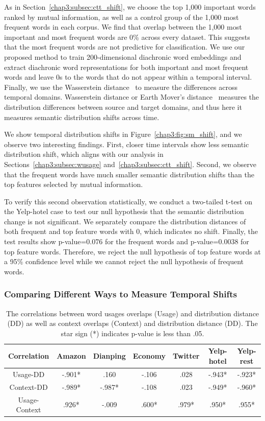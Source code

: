 As in Section~\ref{chap3:subsec:ctt_shift},
we choose the top 1,000 important words ranked by mutual information, as well as a control group of the 1,000 most frequent words in each corpus.  We find that overlap between the 1,000 most important and most frequent words are 0\% across every dataset. This suggests that the most frequent words are not predictive for classification. 
We use our proposed method to train 200-dimensional diachronic word embeddings and extract diachronic word representations for both important and most frequent words and leave 0s to the words that do not appear within a temporal interval. 
Finally, we use the Wasserstein distance~\cite{vallender1974calculation} to measure the differences across temporal domains.
Wasserstein distance or Earth Mover's distance~\cite{vallender1974calculation} measures the distribution differences between source and target domains,
and thus here it measures semantic distribution shifts across time. 

We show temporal distribution shifts in Figure~\ref{chap3:fig:sm_shift}, 
and we observe two interesting findings. 
First, closer time intervals show less semantic distribution shift, which aligns with our analysis in Sections~\ref{chap3:subsec:wusage} and~\ref{chap3:subsec:ctt_shift}. Second, we observe that the frequent words have much smaller semantic distribution shifts than the top features selected by mutual information. 

To verify this second observation statistically, we conduct a two-tailed t-test on the Yelp-hotel case to test our null hypothesis that the semantic distribution change is not significant. We separately compare the distribution distances of both frequent and top feature words with 0, which indicates no shift. Finally, the test results show p-value=0.076 for the frequent words and p-value=0.0038 for top feature words. Therefore, we reject the null hypothesis of top feature words at a 95\% confidence level while we cannot reject the null hypothesis of frequent words.


\subsubsection{Comparing Different Ways to Measure Temporal Shifts}

\begin{table}[ht]
\centering
\begin{tabular}{c||cccccc}
Correlation & Amazon  & Dianping & Economy & Twitter & Yelp-hotel & Yelp-rest \\\hline\hline
Usage-DD    & -.901* & .160    & -.106  & .028   & -.943*    & -.923*   \\
Context-DD  & -.989* & -.987*   & -.108  & .023   & -.949*    & -.960*  \\
Usage-Context  & .926* & -.009   & .600*  & .979*   & .950*    & .955*  
\end{tabular}
\caption{The correlations between word usages overlaps (Usage) and distribution distance (DD) as well as context overlaps (Context) and distribution distance (DD). The star sign (*) indicates p-value is less than .05.}
\label{chap3:tab:corr}
\end{table}

